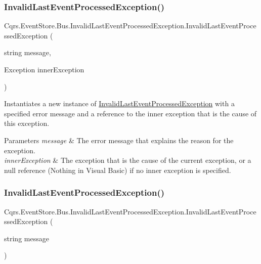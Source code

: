 \subsubsection{\texorpdfstring{Invalid\+Last\+Event\+Processed\+Exception()}{InvalidLastEventProcessedException()}\hspace{0.1cm}{\footnotesize\ttfamily [2/4]}}
{\footnotesize\ttfamily Cqrs.\+Event\+Store.\+Bus.\+Invalid\+Last\+Event\+Processed\+Exception.\+Invalid\+Last\+Event\+Processed\+Exception (\begin{DoxyParamCaption}\item[{string}]{message,  }\item[{Exception}]{inner\+Exception }\end{DoxyParamCaption})}



Instantiates a new instance of \hyperlink{classCqrs_1_1EventStore_1_1Bus_1_1InvalidLastEventProcessedException}{Invalid\+Last\+Event\+Processed\+Exception} with a specified error message and a reference to the inner exception that is the cause of this exception. 


\begin{DoxyParams}{Parameters}
{\em message} & The error message that explains the reason for the exception.\\
\hline
{\em inner\+Exception} & The exception that is the cause of the current exception, or a null reference (Nothing in Visual Basic) if no inner exception is specified.\\
\hline
\end{DoxyParams}
\mbox{\label{classCqrs_1_1EventStore_1_1Bus_1_1InvalidLastEventProcessedException_a01e8e2b27b64b5404f20bcfa2627b06c_a01e8e2b27b64b5404f20bcfa2627b06c}} 
\subsubsection{\texorpdfstring{Invalid\+Last\+Event\+Processed\+Exception()}{InvalidLastEventProcessedException()}\hspace{0.1cm}{\footnotesize\ttfamily [3/4]}}
{\footnotesize\ttfamily Cqrs.\+Event\+Store.\+Bus.\+Invalid\+Last\+Event\+Processed\+Exception.\+Invalid\+Last\+Event\+Processed\+Exception (\begin{DoxyParamCaption}\item[{string}]{message }\end{DoxyParamCaption})}



